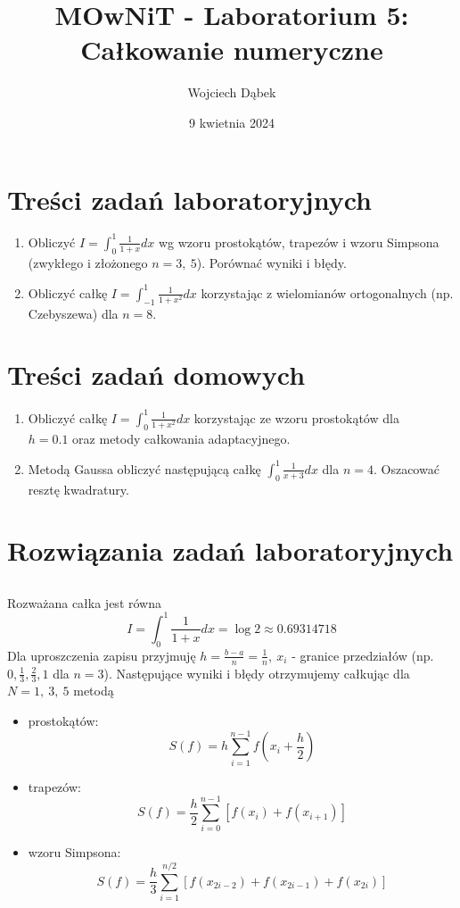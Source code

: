 \documentclass{article}
\title{MOwNiT - Laboratorium 5:\\
Całkowanie numeryczne}
\author{Wojciech Dąbek}
\date{9 kwietnia 2024}
\begin{document}
\maketitle

\section{Treści zadań laboratoryjnych}

\begin{enumerate}
    \item Obliczyć \(I = \int_0^1 \frac{1}{1+x}dx\) wg wzoru prostokątów, trapezów i wzoru Simpsona (zwykłego i złożonego \(n = 3,\ 5\)). Porównać wyniki i błędy.
    \item Obliczyć całkę \(I = \int_{-1}^1 \frac{1}{1 + x^2}dx\) korzystając z wielomianów ortogonalnych (np. Czebyszewa) dla \(n = 8\).
\end{enumerate}

\section{Treści zadań domowych}

\begin{enumerate}
    \item Obliczyć całkę \(I = \int_0^1 \frac{1}{1 + x^2}dx\) korzystając ze wzoru prostokątów dla\\
    \(h = 0.1\) oraz metody całkowania adaptacyjnego.
    \item Metodą Gaussa obliczyć następującą całkę \(\int_0^1 \frac{1}{x+3}dx\) dla \(n = 4\). Oszacować resztę kwadratury.
\end{enumerate}

\section{Rozwiązania zadań laboratoryjnych}

\subsection{}
Rozważana całka jest równa
\[I = \int_0^1 \frac{1}{1+x}dx = \log 2 \approx 0.69314718\]
Dla uproszczenia zapisu przyjmuję \(h = \frac{b - a}{n} = \frac{1}{n},\ x_i\) - granice przedziałów (np. \(0, \frac{1}{3}, \frac{2}{3}, 1\) dla \(n = 3\)).
Następujące wyniki i błędy otrzymujemy całkując dla \(N = 1,\ 3,\ 5\) metodą
\begin{itemize}
    \item prostokątów:
    \[S(f) = h \sum_{i=1}^{n-1} f(x_i + \frac{h}{2})\]
    \item trapezów:
    \[S(f) = \frac{h}{2} \sum_{i=0}^{n-1} [f(x_i) + f(x_{i+1})]\]
    \item wzoru Simpsona:
    \[S(f) = \frac{h}{3} \sum_{i=1}^{n/2} [f(x_{2i-2}) + f(x_{2i-1}) + f(x_{2i})]\]
\end{itemize}
\end{document}
